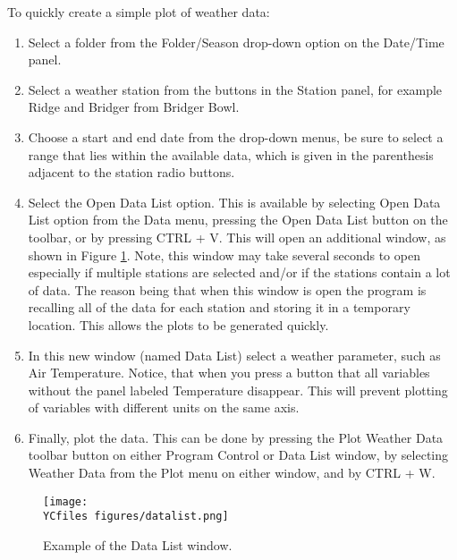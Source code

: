 \label{sec:tutorial}
To quickly create a simple plot of weather data:
\begin{enumerate}
	\item Select a folder from the Folder/Season drop-down option on the Date/Time panel.
	\item Select a weather station from the buttons in the Station panel, for example Ridge and Bridger from Bridger Bowl.
	\item Choose a start and end date from the drop-down menus, be sure to select a range that lies within the available data, which is given in the parenthesis adjacent to the station radio buttons.	
	\item Select the Open Data List option.  This is available by selecting Open Data List option from the Data menu, pressing the Open Data List button on the toolbar, or by pressing CTRL + V.  This will open an additional window, as shown in Figure \ref{fig:datalist}. 
Note, this window may take several seconds to open especially if multiple stations are selected and/or if the stations contain a lot of data.  The reason being that when this window is open the program is recalling all of the data for each station and storing it in a temporary location. This allows the plots to be generated quickly.
	\item In this new window (named Data List) select a weather parameter, such as Air Temperature.  Notice, that when you press a button that all variables without the panel labeled Temperature disappear.  This will prevent plotting of variables with different units on the same axis.	
	\item Finally, plot the data.  This can be done by pressing the Plot Weather Data toolbar button on either Program Control or Data List window, by selecting Weather Data from the Plot menu on either window, and by CTRL + W.
\end{enumerate}

\begin{figure}[ht!]\centering
	\texttt{[image: \\YCfiles figures/datalist.png]}
	\caption{Example of the Data List window.}\label{fig:datalist}
\end{figure}
































